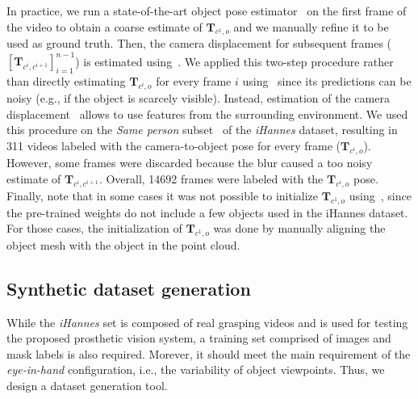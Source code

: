 In practice, we run a state-of-the-art object pose estimator~\cite{wang2021} on the first frame of the video to obtain a coarse estimate of $\mathbf{T}_{c^1,o}$ and we manually refine it to be used as ground truth. Then, the camera displacement for subsequent frames ($[\mathbf{T}_{c^i,c^{i+1}}]_{i=1}^{n-1}$) is estimated using~\cite{park2017colored}. We applied this two-step procedure rather than directly estimating $\mathbf{T}_{c^i,o}$ for every frame $i$ using~\cite{wang2021} since its predictions can be noisy (e.g., if the object is scarcely visible). Instead, estimation of the camera displacement~\cite{park2017colored} allows to use features from the surrounding environment. We used this procedure on the \textit{Same person} subset~\cite{vasile2022} of the \textit{iHannes} dataset, resulting in 311 videos labeled with the camera-to-object pose for every frame ($\mathbf{T}_{c^i,o}$). However, some frames were discarded because the blur caused a too noisy estimate of $\mathbf{T}_{c^i,c^{i+1}}$. Overall, 14692 frames were labeled with the $\mathbf{T}_{c^i,o}$ pose. Finally, note that in some cases it was not possible to initialize $\mathbf{T}_{c^1,o}$ using~\cite{wang2021}, since the pre-trained weights do not include a few objects used in the iHannes dataset. For those cases, the initialization of $\mathbf{T}_{c^1,o}$ was done by manually aligning the object mesh with the object in the point cloud.

\subsection{Synthetic dataset generation}
\label{sec:synthetic_dataset_generation}
While the \textit{iHannes} set is composed of real grasping videos and is used for testing the proposed prosthetic vision system, a training set comprised of images and mask labels is also required. Morever, it should meet the main requirement of the \textit{eye-in-hand} configuration, i.e., the variability of object viewpoints. Thus, we design a dataset generation tool.

